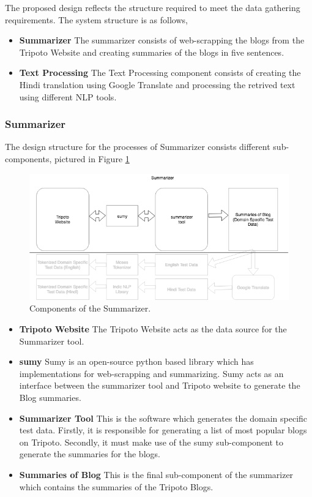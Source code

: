 The proposed design reflects the structure required to meet the data gathering requirements. The system structure is as follows,

\begin{itemize}
    \item \textbf{Summarizer} The summarizer consists of web-scrapping the blogs from the Tripoto Website and creating summaries of the blogs in five sentences.
    \item \textbf{Text Processing} The Text Processing component consists of creating the Hindi translation using Google Translate and processing the retrived text using different NLP tools.
\end{itemize}

\subsubsection{Summarizer}
The design structure for the processes of Summarizer consists different sub-components, pictured in Figure \ref{summarizer2}

\begin{figure}[h]
\includegraphics[width=\textwidth]{figures/design5.png}
\caption{Components of the Summarizer.} \label{summarizer2}
\end{figure}

\begin{itemize}
    \item \textbf{Tripoto Website} The Tripoto Website acts as the data source for the Summarizer tool. 
    \item \textbf{sumy} Sumy is an open-source python based library which has implementations for web-scrapping and summarizing. Sumy acts as an interface between the summarizer tool and Tripoto website to generate the Blog summaries.
    \item \textbf{Summarizer Tool} This is the software which generates the domain specific test data. Firstly, it is responsible for generating a list of most popular blogs on Tripoto. Secondly, it must make use of the sumy sub-component to generate the summaries for the blogs.
    \item \textbf{Summaries of Blog} This is the final sub-component of the summarizer which contains the summaries of the Tripoto Blogs.
\end{itemize} 

